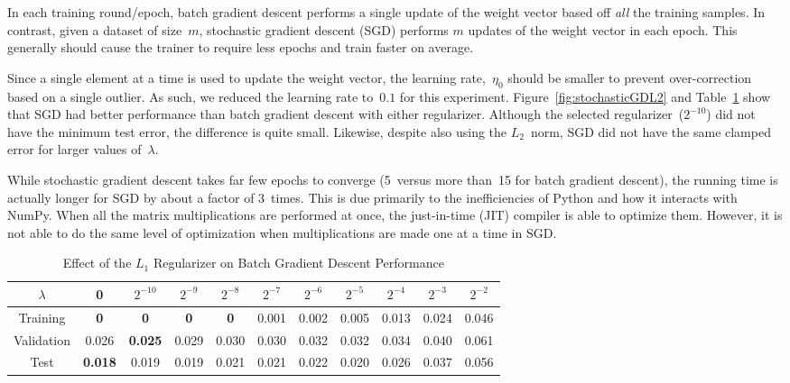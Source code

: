 \documentclass{report}
\begin{document}
  In each training round/epoch, batch gradient descent performs a single update of the weight vector based off \textit{all} the training samples.  In contrast, given a dataset of size~$m$, stochastic gradient descent (SGD) performs $m$ updates of the weight vector in each epoch.  This generally should cause the trainer to require less epochs and train faster on average.
  
  Since a single element at a time is used to update the weight vector, the learning rate,~$\eta_{0}$ should be smaller to prevent over-correction based on a single outlier.  As such, we reduced the learning rate to~$0.1$ for this experiment.  Figure~\ref{fig:stochasticGDL2} and Table~\ref{tab:stochasticGradientDescentL2} show that SGD had better performance than batch gradient descent with either regularizer.  Although the selected regularizer~($2^{-10}$) did not have the minimum test error, the difference is quite small.  Likewise, despite also using the $L_2$~norm, SGD did not have the same clamped error for larger values of~$\lambda$.
  
  While stochastic gradient descent takes far few epochs to converge (5~versus more than~15 for batch gradient descent), the running time is actually longer for SGD by about a factor of 3~times.  This is due primarily to the inefficiencies of Python and how it interacts with NumPy.  When all the matrix multiplications are performed at once, the just-in-time (JIT) compiler is able to optimize them.  However, it is not able to do the same level of optimization when multiplications are made one at a time in SGD.
  
    \begin{table}[]
    \centering
    \caption{Effect of the $L_1$ Regularizer on Batch Gradient Descent Performance}
    \label{tab:stochasticGradientDescentL2}
    \begin{tabular}{c||c|c|c|c|c|c|c|c|c|c}
      \hline
      $\lambda$  & 0              & $2^{-10}$ & $2^{-9}$ & $2^{-8}$       & $2^{-7}$ & $2^{-6}$ & $2^{-5}$ & $2^{-4}$ & $2^{-3}$ & $2^{-2}$ \\ \hline
      Training   & \textbf{0}  & \textbf{0}    & \textbf{0}    & \textbf{0} & 0.001   & 0.002    & 0.005    & 0.013    & 0.024    & 0.046    \\ \hline
      Validation & 0.026 & \textbf{0.025}    & 0.029  & 0.030 & 0.030    & 0.032    & 0.032    & 0.034    & 0.040    & 0.061    \\ \hline
      Test       & \textbf{0.018} & 0.019     & 0.019    & 0.021          & 0.021    & 0.022    & 0.020    & 0.026    & 0.037    & 0.056    \\ \hline
    \end{tabular}
  \end{table}
  
\end{document}
